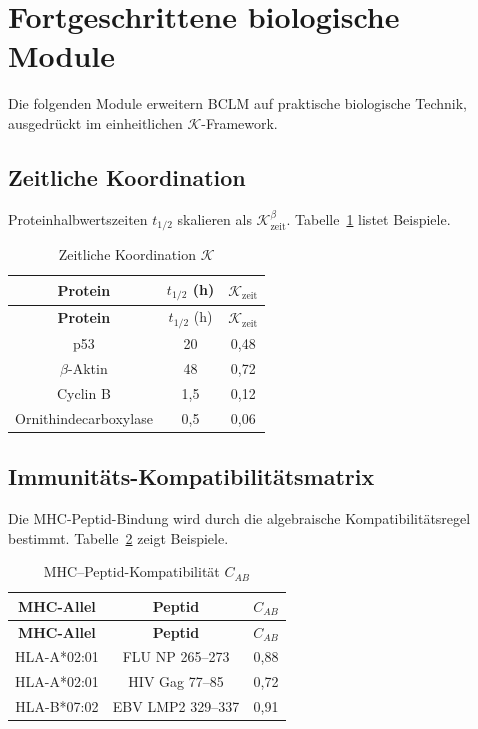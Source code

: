 \documentclass[12pt,a4paper]{article}
\newcommand{\REL}{\mathcal{K}}          %
\begin{document}
	\section{Fortgeschrittene biologische Module}
	\label{sec:modules}
	Die folgenden Module erweitern BCLM auf praktische biologische Technik, ausgedrückt im einheitlichen \(\REL\)-Framework.
	
	\subsection{Zeitliche Koordination}
	Proteinhalbwertszeiten \(t_{1/2}\) skalieren als \(\REL_{\mathrm{zeit}}^{\beta}\). Tabelle~\ref{tab:temporal} listet Beispiele.
	
	\begin{longtable}{|c|c|c|}
		\caption{Zeitliche Koordination \(\REL\)}\label{tab:temporal}\\
		\hline
		\textbf{Protein} & \(t_{1/2}\) (h) & \(\REL_{\mathrm{zeit}}\) \\
		\hline
		\endfirsthead
		\hline
		\textbf{Protein} & \(t_{1/2}\) (h) & \(\REL_{\mathrm{zeit}}\) \\
		\hline
		\endhead
		\hline
		p53 & 20 & 0,48 \\
		\(\beta\)-Aktin & 48 & 0,72 \\
		Cyclin B & 1,5 & 0,12 \\
		Ornithindecarboxylase & 0,5 & 0,06 \\
		\hline
	\end{longtable}
	
	\subsection{Immunitäts-Kompatibilitätsmatrix}
	Die MHC-Peptid-Bindung wird durch die algebraische Kompatibilitätsregel bestimmt. Tabelle~\ref{tab:mhc} zeigt Beispiele.
	
	\begin{longtable}{|c|c|c|}
		\caption{MHC–Peptid-Kompatibilität \(C_{AB}\)}\label{tab:mhc}\\
		\hline
		\textbf{MHC-Allel} & \textbf{Peptid} & \(C_{AB}\) \\
		\hline
		\endfirsthead
		\hline
		\textbf{MHC-Allel} & \textbf{Peptid} & \(C_{AB}\) \\
		\hline
		\endhead
		\hline
		HLA-A*02:01 & FLU NP 265–273 & 0,88 \\
		HLA-A*02:01 & HIV Gag 77–85 & 0,72 \\
		HLA-B*07:02 & EBV LMP2 329–337 & 0,91 \\
		\hline
	\end{longtable}
	
\end{document}
